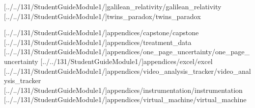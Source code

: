 \documentclass[english,twoside]{article}
\begin{document}

[../../131/StudentGuideModule1/]{galilean_relativity/galilean_relativity} %
[../../131/StudentGuideModule1/]{twins_paradox/twins_paradox}

\startappendix

[../../131/StudentGuideModule1/]{appendices/capstone/capstone}
[../../131/StudentGuideModule1/]{appendices/treatment_data}
[../../131/StudentGuideModule1/]{appendices/one_page_uncertainty/one_page_uncertainty}
[../../131/StudentGuideModule1/]{appendices/excel/excel}
[../../131/StudentGuideModule1/]{appendices/video_analysis_tracker/video_analysis_tracker}
[../../131/StudentGuideModule1/]{appendices/instrumentation/instrumentation}
[../../131/StudentGuideModule1/]{appendices/virtual_machine/virtual_machine}

\end{document}
